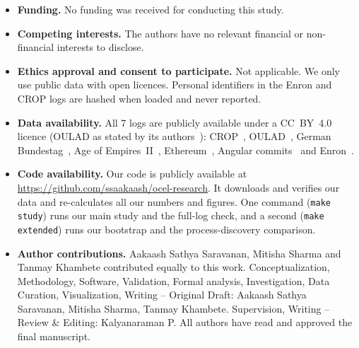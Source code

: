 \documentclass[pdflatex,sn-mathphys-num]{sn-jnl}
\begin{document}
\begin{itemize}
\item \textbf{Funding.} No funding was received for conducting this study.
\item \textbf{Competing interests.} The authors have no relevant financial or non-financial interests to disclose.
\item \textbf{Ethics approval and consent to participate.} Not applicable. We only use public data with open licences. Personal identifiers in the Enron and CROP logs are hashed when loaded and never reported.
\item \textbf{Data availability.} All 7 logs are publicly available under a CC~BY~4.0 licence (OULAD as stated by its authors~\cite{kuzilek2017oulad}): CROP~\cite{data_crop}, OULAD~\cite{data_oulad}, German Bundestag~\cite{data_bundestag}, Age of Empires~II~\cite{data_aoe2}, Ethereum~\cite{data_ethereum}, Angular commits~\cite{data_angular} and Enron~\cite{data_enron}.
\item \textbf{Code availability.} Our code is publicly available at \url{https://github.com/ssaakaash/ocel-research}. It downloads and verifies our data and re-calculates all our numbers and figures. One command (\texttt{make study}) runs our main study and the full-log check, and a second (\texttt{make extended}) runs our bootstrap and the process-discovery comparison.
\item \textbf{Author contributions.} Aakaash Sathya Saravanan, Mitisha Sharma and Tanmay Khambete contributed equally to this work. Conceptualization, Methodology, Software, Validation, Formal analysis, Investigation, Data Curation, Visualization, Writing -- Original Draft: Aakaash Sathya Saravanan, Mitisha Sharma, Tanmay Khambete. Supervision, Writing -- Review \& Editing: Kalyanaraman P. All authors have read and approved the final manuscript.
\end{itemize}


\end{document}
